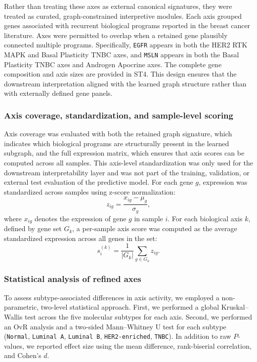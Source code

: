 \documentclass[unnumsec,webpdf,modern,large]{oup-authoring-template}
\newcounter{panel}
\begin{document}
Rather than treating these axes as external canonical signatures, they were treated as curated, graph-constrained interpretive modules. Each axis grouped genes associated with recurrent biological programs reported in the breast cancer literature. Axes were permitted to overlap when a retained gene plausibly connected multiple programs. Specifically, \texttt{EGFR} appears in both the HER2 RTK MAPK and Basal Plasticity TNBC axes, and \texttt{MSLN} appears in both the Basal Plasticity TNBC axes and Androgen Apocrine axes. The complete gene composition and axis sizes are provided in ST4. This design ensures that the downstream interpretation aligned with the learned graph structure rather than with externally defined gene panels.

\subsubsection{Axis coverage, standardization, and sample-level scoring}
Axis coverage was evaluated with both the retained graph signature, which indicates which biological programs are structurally present in the learned subgraph, and the full expression matrix, which ensures that axis scores can be computed across all samples. This axis-level standardization was only used for the downstream interpretability layer and was not part of the training, validation, or external test evaluation of the predictive model. For each gene \(g\), expression was standardized across samples using z-score normalization:
\[
z_{ig} = \frac{x_{ig}-\mu_g}{\sigma_g},
\]
where \(x_{ig}\) denotes the expression of gene \(g\) in sample \(i\). For each biological axis \(k\), defined by gene set \(G_k\), a per-sample axis score was computed as the average standardized expression across all genes in the set:
\[
s_i^{(k)} = \frac{1}{|G_k|}\sum_{g\in G_k} z_{ig}.
\]

\subsubsection{Statistical analysis of refined axes}
To assess subtype-associated differences in axis activity, we employed a non-parametric, two-level statistical approach. First, we performed a global Kruskal--Wallis test across the five molecular subtypes for each axis. Second, we performed an OvR analysis and a two-sided Mann--Whitney U test for each subtype (\texttt{Normal}, \texttt{Luminal A}, \texttt{Luminal B}, \texttt{HER2-enriched}, \texttt{TNBC}). In addition to raw \(P\)-values, we reported effect size using the mean difference, rank-biserial correlation, and Cohen's \(d\). 
\end{document}
